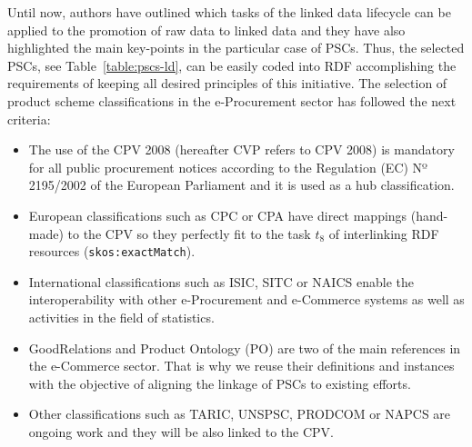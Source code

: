 Until now, authors have outlined which tasks of the linked data lifecycle can be applied to the promotion of raw data to 
linked data and they have also highlighted the main key-points in the particular case of PSCs. Thus, the selected PSCs, see Table~\ref{table:pscs-ld}, 
can be easily coded into RDF accomplishing the requirements of keeping all desired principles of this initiative. 
The selection of product scheme classifications in the e-Procurement sector has followed the next criteria: 
\begin{itemize}
 \item The use of the CPV 2008 (hereafter CVP refers to CPV 2008) is mandatory for all public procurement notices according 
 to the Regulation (EC) Nº 2195/2002 of the European Parliament and it is used as a hub classification.
 \item European classifications such as CPC or CPA have direct mappings (hand-made) to the CPV so they perfectly fit 
 to the task $t_8$ of interlinking RDF resources (\texttt{skos:exactMatch}).
 \item International classifications such as ISIC, SITC or NAICS enable the interoperability with 
 other e-Procurement and e-Commerce systems as well as activities in the field of statistics.
 \item GoodRelations and Product Ontology (PO) are two of the main references in the e-Commerce sector. 
 That is why we reuse their definitions and instances with the objective of aligning the linkage of PSCs to existing efforts. 
 \item Other classifications such as TARIC, UNSPSC, PRODCOM or NAPCS are ongoing work and they will be also linked to the CPV.
\end{itemize}

